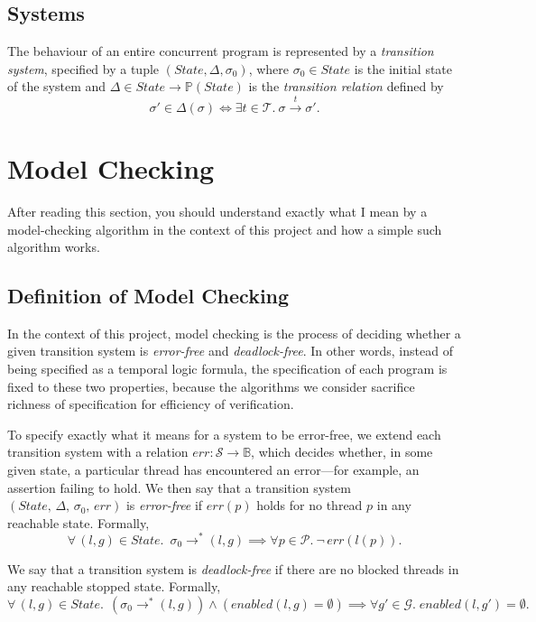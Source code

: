 \documentclass[12pt,a4paper,twoside,openright]{report}
\begin{document}
\subsection{Systems}
The behaviour of an entire concurrent program is represented by a
\emph{transition system},
specified by a tuple $(\textit{State}, \Delta, \sigma_0)$,
where $\sigma_0 \in \textit{State}$ is the initial state of the system and
$\Delta \in State \to \mathbb{P}(State)$
is the \emph{transition relation} defined by
\[
	\sigma' \in \Delta(\sigma) \iff
	\exists t \in \mathcal{T}. \ \sigma \xrightarrow{t} \sigma'.
\]

\section{Model Checking}
After reading this section, you should
understand exactly what I mean by a
model-checking algorithm in the context
of this project and how a simple
such algorithm works.

\subsection{Definition of Model Checking}
\label{sec:model-checking-dfn}
In the context of this project,
model checking is the process of deciding
whether a
given transition system is \emph{error-free} and
\emph{deadlock-free}. In other words, instead of
being specified as a temporal logic formula,
the specification of each program is fixed
to these two properties, because the algorithms we
consider sacrifice richness of specification
for efficiency of verification.

To specify exactly what it means for a system to
be error-free, we extend each transition system
with a relation
$\textit{err} : \mathcal{S} \to \mathbb{B}$, which decides
whether, in some given state, a particular
thread has encountered an error---for example,
an assertion failing to hold.
We then say that a transition system
$(\textit{State},\, \Delta,\, \sigma_0,\, \textit{err})$
is
\emph{error-free} if
$\textit{err}(p)$ holds for no
thread $p$ in any reachable state.
Formally,
\[
	\forall\, (l, g) \in \textit{State}.\; \ \sigma_0 \longrightarrow^* (l, g)
	\implies \forall p \in \mathcal{P}.\ \neg\,\textit{err}(l(p)).
\]

We say that a transition system
is \textit{deadlock-free} if
there are no
blocked threads in any reachable
stopped state.
Formally,
\[
	\forall\, (l, g) \in \textit{State}. \;\, (\sigma_0
	 \longrightarrow^* (l, g))
	\wedge (\textit{enabled}(l, g) = \emptyset)
	\implies \forall g' \in \mathcal{G}. \;
		\textit{enabled}(l, g') = \emptyset.
\]
\end{document}
